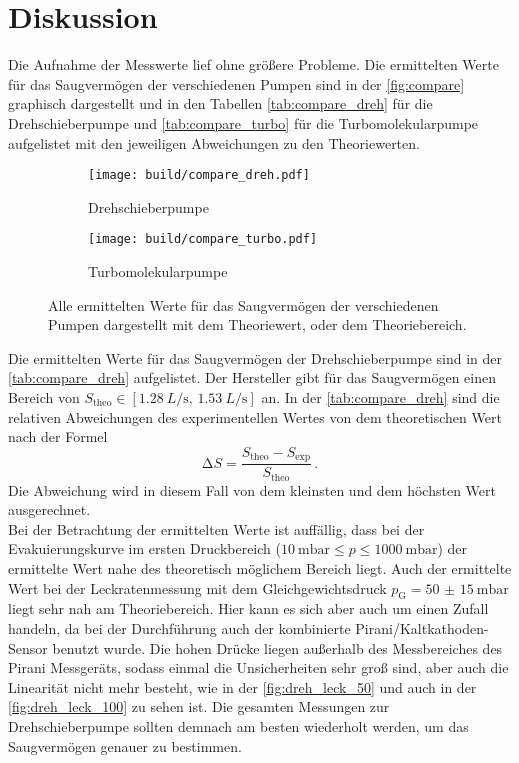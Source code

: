 \section{Diskussion}
\label{sec:Diskussion}

\noindent Die Aufnahme der Messwerte lief ohne größere Probleme. Die ermittelten Werte für das Saugvermögen der verschiedenen Pumpen sind in der \autoref{fig:compare} 
graphisch dargestellt und in den Tabellen \ref{tab:compare_dreh} für die Drehschieberpumpe und \ref{tab:compare_turbo} für die Turbomolekularpumpe
aufgelistet mit den jeweiligen Abweichungen zu den Theoriewerten.

\begin{figure}[h]
    \begin{subfigure}{0.48\textwidth}
        \centering
        \texttt{[image: build/compare\_dreh.pdf]}
        \caption{Drehschieberpumpe}
        \label{fig:saug_dreh}
    \end{subfigure}
    \hfill 
    \begin{subfigure}{0.48\textwidth}
        \centering
        \texttt{[image: build/compare\_turbo.pdf]}
        \caption{Turbomolekularpumpe}
        \label{fig:saug_turbo}
    \end{subfigure}
    \caption{Alle ermittelten Werte für das Saugvermögen der verschiedenen Pumpen dargestellt mit dem Theoriewert, oder dem Theoriebereich.}
    \label{fig:compare}
\end{figure}

\noindent Die ermittelten Werte für das Saugvermögen der Drehschieberpumpe sind in der \autoref{tab:compare_dreh} aufgelistet. Der Hersteller gibt für das Saugvermögen einen Bereich 
von $ S_\text{theo} \in [\SI{1.28}{L\per\second},\, \SI{1.53}{L\per\second}]$ an. In der \autoref{tab:compare_dreh} sind die relativen Abweichungen des experimentellen Wertes von 
dem theoretischen Wert nach der Formel 
\begin{equation}
    \increment S = \frac{S_\text{theo} - S_\text{exp}}{S_\text{theo}}\, .
    \label{eqn:rel_abw}
\end{equation}
Die Abweichung wird in diesem Fall von dem kleinsten und dem höchsten Wert ausgerechnet. \\
Bei der Betrachtung der ermittelten Werte ist auffällig, dass bei der Evakuierungskurve im ersten Druckbereich ($\SI{10}{\milli\bar} \leq p \leq \SI{1000}{\milli\bar}$) der ermittelte 
Wert nahe des theoretisch möglichem Bereich liegt. Auch der ermittelte Wert bei der Leckratenmessung mit dem Gleichgewichtsdruck $p_\text{G} = \SI{50(15)}{\milli\bar}$ liegt sehr nah am Theoriebereich. 
Hier kann es sich aber auch um einen Zufall handeln, da bei der Durchführung auch der kombinierte Pirani/Kaltkathoden-Sensor benutzt wurde. Die hohen Drücke liegen außerhalb des Messbereiches des Pirani Messgeräts, 
sodass einmal die Unsicherheiten sehr groß sind, aber auch die Linearität nicht mehr besteht, wie in der \autoref{fig:dreh_leck_50} und auch in der \autoref{fig:dreh_leck_100} zu sehen ist. 
Die gesamten Messungen zur Drehschieberpumpe sollten demnach am besten wiederholt werden, um das Saugvermögen genauer zu bestimmen. 

